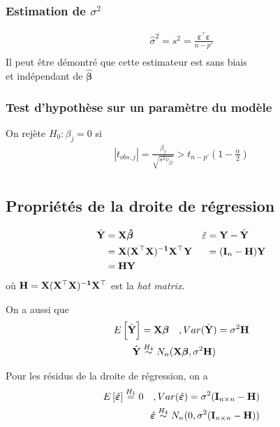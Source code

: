 \documentclass[10pt, french]{article}
\begin{document}
\begin{multicols*}{3}
\subsubsection*{Estimation de $\sigma^2$}
\begin{align*}
\hat{\sigma}^2 = s^2 = \frac{\hat{\bm{\varepsilon}}^\top \hat{\bm{\varepsilon}}}{n-p'} \\
\end{align*}
Il peut être démontré que cette estimateur est sans biais \\
et indépendant de $\bm{\hat{\beta}}$

\subsubsection*{Test d'hypothèse sur un paramètre du modèle}
On rejète $H_0 : \beta_j = 0$ si
\begin{align*}
|t_{obs, j}| = \frac{\beta_j}{\sqrt{s^2 v_{jj}} } > t_{n-p'}\left(1 - \frac{\alpha}{2} \right) \\
\end{align*}

\subsection*{Propriétés de la droite de régression}
\begin{align*}
	\hat{\mathbf{Y}}	& = \mathbf{X} \bm{\hat{\beta}}  &&\hat{\varepsilon} = \mathbf{Y} - \hat{\mathbf{Y}}\\
		& = \mathbf{X(X^\top X)^{-1} X^\top Y} && \:\:= (\mathbf{I}_n - \mathbf{H})\mathbf{Y}	\\
		& = \mathbf{H Y} 
\end{align*}	
où $\mathbf{H = X(X^\top X)^{-1}X^\top}$ est la \textit{hat matrix}.

On a aussi que
\begin{align*}
E \left[ \hat{\mathbf{Y}} \right] & = \mathbf{X} \bm{\beta} \quad , Var(\hat{\mathbf{Y}}) = \sigma^2 \mathbf{H} \\
\hat{\mathbf{Y}} & \overset{H_4}{\sim} N_n(\mathbf{X} \bm{\beta} , \sigma^2 \mathbf{H}) \\
\end{align*}

Pour les résidus de la droite de régression, on a
\begin{align*}
E \left[ \hat{\bm{\varepsilon}} \right]  \overset{H_1}{=} 0 \quad , Var(\hat{\bm{\varepsilon}}) = \sigma^2(\mathbf{I}_{n \times n} - \mathbf{H}) \\
\hat{\bm{\varepsilon}} \overset{H_4}{\sim} N_n(0, \sigma^2 (\mathbf{I}_{n \times n} - \mathbf{H})) \\
\end{align*}


\end{multicols*}
\end{document}
